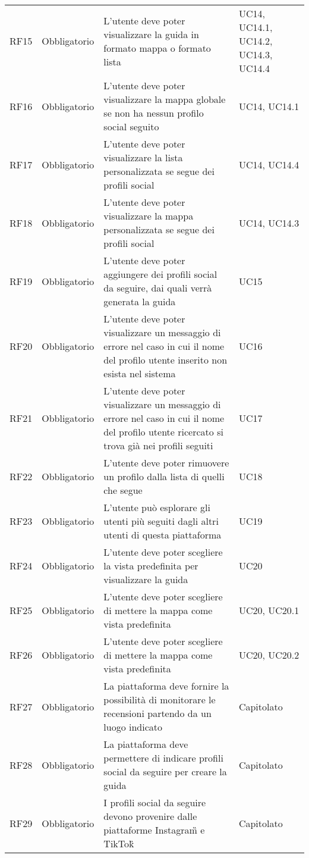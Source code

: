 {\begin{longtable}{C{.15\freewidth} C{.2\freewidth} C{.528\freewidth} C{.15\freewidth}}
      RF15 & Obbligatorio & L'utente deve poter visualizzare la guida in formato mappa o formato lista & UC14, UC14.1, UC14.2, UC14.3, UC14.4 \\
      RF16 & Obbligatorio & L'utente deve poter visualizzare la mappa globale se non ha nessun profilo social seguito & UC14, UC14.1 \\
      RF17 & Obbligatorio & L'utente deve poter visualizzare la lista personalizzata se segue dei profili social & UC14, UC14.4 \\
      RF18 & Obbligatorio & L'utente deve poter visualizzare la mappa personalizzata se segue dei profili social & UC14, UC14.3 \\
      RF19 & Obbligatorio & L'utente deve poter aggiungere dei profili social da seguire, dai quali verrà generata la guida & UC15 \\
      RF20 & Obbligatorio & L'utente deve poter visualizzare un messaggio di errore nel caso in cui il nome del profilo utente inserito non esista nel sistema & UC16 \\
      RF21 & Obbligatorio & L'utente deve poter visualizzare un messaggio di errore nel caso in cui il nome del profilo utente ricercato si trova già nei profili seguiti & UC17 \\
      RF22 & Obbligatorio & L'utente deve poter rimuovere un profilo dalla lista di quelli che segue & UC18 \\
      RF23 & Obbligatorio & L'utente può esplorare gli utenti più seguiti dagli altri utenti di questa piattaforma & UC19 \\
      RF24 & Obbligatorio & L'utente deve poter scegliere la vista predefinita per visualizzare la guida & UC20 \\
      RF25 & Obbligatorio & L'utente deve poter scegliere di mettere la mappa come vista predefinita & UC20, UC20.1 \\
      RF26 & Obbligatorio & L'utente deve poter scegliere di mettere la mappa come vista predefinita & UC20, UC20.2 \\	
      RF27 & Obbligatorio & La piattaforma deve fornire la possibilità di monitorare le recensioni partendo da un luogo indicato & Capitolato \\
      RF28 & Obbligatorio & La piattaforma deve permettere di indicare profili social da seguire per creare la guida & Capitolato \\
      RF29 & Obbligatorio & I profili social da seguire devono provenire dalle piattaforme Instagram\G{} e TikTok\G{} & Capitolato \\   

\end{longtable}}
